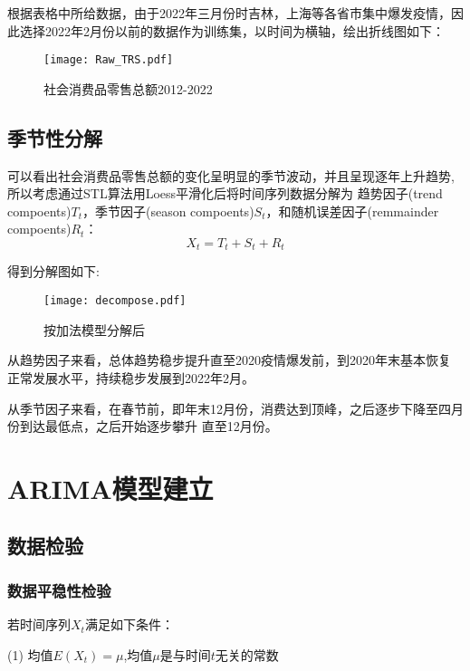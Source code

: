 \documentclass[12pt,a4paper]{nmmcm}
\begin{document}
根据表格中所给数据，由于2022年三月份时吉林，上海等各省市集中爆发疫情，因此选择2022年2月份以前的数据作为训练集，以时间为横轴，绘出折线图如下：
\begin{figure}[H] %
  \centering %
  \texttt{[image: Raw\_TRS.pdf]} %
  \caption{社会消费品零售总额2012-2022} %
  \label{TRS} %
  \end{figure} 
\subsection{季节性分解}
可以看出社会消费品零售总额的变化呈明显的季节波动，并且呈现逐年上升趋势,
所以考虑通过STL算法用Loess平滑化后将时间序列数据分解为
趋势因子(trend compoents)\(T_t\)，季节因子(season compoents)\(S_t\)，和随机误差因子(remmainder compoents)\(R_t\)\cite{STL}\nocite{yang2022estimating}：
\begin{equation}
  X_t = T_t + S_t + R_t
\end{equation}

得到分解图如下:
\begin{figure}[H] %
  \centering %
  \texttt{[image: decompose.pdf]} %
  \caption{按加法模型分解后} %
  \label{decompose} %
\end{figure} 

从趋势因子来看，总体趋势稳步提升直至2020疫情爆发前，到2020年末基本恢复
正常发展水平，持续稳步发展到2022年2月。
 \par 从季节因子来看，在春节前，即年末12月份，消费达到顶峰，之后逐步下降至四月份到达最低点，之后开始逐步攀升
直至12月份。
\section{ARIMA模型建立}

\subsection{数据检验}

\subsubsection*{数据平稳性检验}
若时间序列\(X_t\)满足如下条件：

  (1) 均值\(E ( X_t ) = \mu \),均值\(\mu\)是与时间\(t\)无关的常数
\end{document}
